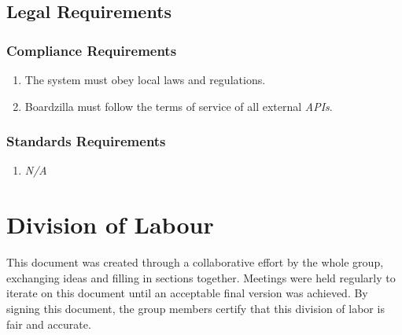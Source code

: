 \documentclass{article}
\begin{document}
\subsection{Legal Requirements}
\label{sub:legal_requirements}

\subsubsection{Compliance Requirements}
\label{ssub:compliance_requirements}
\begin{enumerate}[{LR}1. ]
	\item The system must obey local laws and regulations.
    \item Boardzilla must follow the terms of service of all external \textit{APIs}.
\end{enumerate}

\subsubsection{Standards Requirements}
\label{ssub:standards_requirements}
\begin{enumerate}[{LR}1. ]
	\item \emph{N/A}
\end{enumerate}


\newpage
\appendix
\section{Division of Labour}
\label{sec:division_of_labour}
This document was created through a collaborative effort by the whole group, exchanging ideas and filling in sections together. Meetings were held regularly to iterate on this document until an acceptable final version was achieved. By signing this document, the group members certify that this division of labor is fair and accurate.
\end{document}
